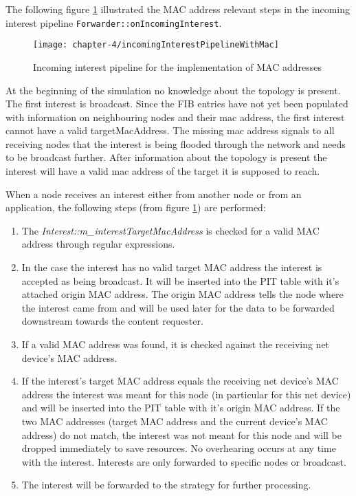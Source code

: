 The following figure \ref{fig:incomingInterestPipelineWithMac} illustrated the MAC address relevant steps in the incoming interest pipeline \texttt{Forwarder::onIncomingInterest}.

\begin{figure}[H]
  \centering
  \texttt{[image: chapter-4/incomingInterestPipelineWithMac]}
  \caption{Incoming interest pipeline for the implementation of MAC addresses}
  \label{fig:incomingInterestPipelineWithMac}
\end{figure}

At the beginning of the simulation no knowledge about the topology is present. The first interest is broadcast. Since the FIB entries have not yet been populated with information on neighbouring nodes and their mac address, the first interest cannot have a valid targetMacAddress. The missing mac address signals to all receiving nodes that the interest is being flooded through the network and needs to be broadcast further. After information about the topology is present the interest will have a valid mac address of the target it is supposed to reach.

When a node receives an interest either from another node or from an application, the following steps (from figure \ref{fig:incomingInterestPipelineWithMac}) are performed:

\begin{enumerate}
\item The \emph{Interest::m\_interestTargetMacAddress} is checked for a valid MAC address through regular expressions.
\item In the case the interest has no valid target MAC address the interest is accepted as being broadcast. It will be inserted into the PIT table with it's attached origin MAC address. The origin MAC address tells the node where the interest came from and will be used later for the data to be forwarded downstream towards the content requester.
\item If a valid MAC address was found, it is checked against the receiving net device's MAC address.
\item If the interest's target MAC address equals the receiving net device's MAC address the interest was meant for this node (in particular for this net device) and will be inserted into the PIT table with it's origin MAC address. If the two MAC addresses (target MAC address and the current device's MAC address) do not match, the interest was not meant for this node and will be dropped immediately to save resources. No overhearing occurs at any time with the interest. Interests are only forwarded to specific nodes or broadcast.
\item The interest will be forwarded to the strategy for further processing.
\end{enumerate}

